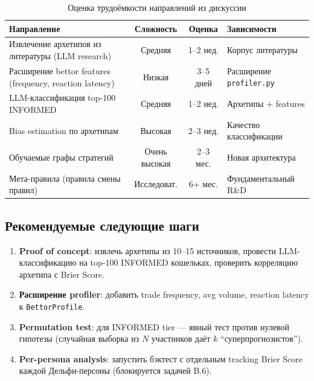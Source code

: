 \documentclass[a4paper, 11pt]{article}
\begin{document}
\begin{table}[ht]
\centering
\small
\begin{tabular}{p{5.5cm}ccp{4cm}}
\toprule
\textbf{Направление} & \textbf{Сложность} & \textbf{Оценка} & \textbf{Зависимости} \\
\midrule
Извлечение архетипов из литературы (LLM research) &
  Средняя & 1--2 нед. & Корпус литературы \\
Расширение bettor features (frequency, reaction latency) &
  Низкая & 3--5 дней & Расширение \texttt{profiler.py} \\
LLM-классификация top-100 INFORMED &
  Средняя & 1--2 нед. & Архетипы + features \\
Bias estimation по архетипам &
  Высокая & 2--3 нед. & Качество классификации \\
Обучаемые графы стратегий &
  Очень высокая & 2--3 мес. & Новая архитектура \\
Мета-правила (правила смены правил) &
  Исследоват. & 6+ мес. & Фундаментальный R\&D \\
\bottomrule
\end{tabular}
\caption{Оценка трудоёмкости направлений из дискуссии}
\label{tab:discussion_effort}
\end{table}

\subsection{Рекомендуемые следующие шаги}

\begin{enumerate}
  \item \textbf{Proof of concept}: извлечь архетипы из 10--15 источников,
    провести LLM-классификацию на top-100 INFORMED кошельках,
    проверить корреляцию архетипа с Brier Score.
  \item \textbf{Расширение profiler}: добавить trade frequency,
    avg volume, reaction latency к \texttt{BettorProfile}.
  \item \textbf{Permutation test}: для INFORMED tier ---
    явный тест против нулевой гипотезы (случайная выборка
    из $N$ участников даёт $k$ ``суперпрогнозистов'').
  \item \textbf{Per-persona analysis}: запустить бэктест
    с отдельным tracking Brier Score каждой Дельфи-персоны
    (блокируется задачей B.6).
\end{enumerate}

\end{document}
